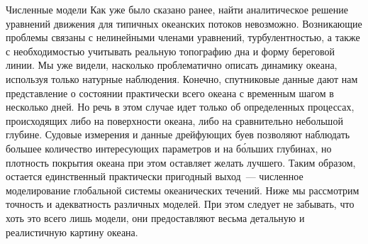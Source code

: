 
\begin{chapter}{Численные модели}\label{chap:15}
Как уже было сказано ранее, найти аналитическое решение уравнений
движения для типичных океанских потоков невозможно. Возникающие проблемы
связаны с нелинейными членами уравнений, 
турбулентностью, а также с
необходимостью учитывать реальную топографию дна и форму береговой
линии. Мы уже видели, насколько проблематично описать динамику океана,
используя только натурные наблюдения. Конечно, спутниковые данные дают
нам представление о состоянии практически всего океана с временным
шагом в несколько дней. Но речь в этом случае идет только об
определенных процессах, происходящих либо на поверхности океана, либо на
сравнительно небольшой глубине.
Судовые измерения и данные дрейфующих буев позволяют наблюдать большее 
количество интересующих параметров и на б\'{о}льших глубинах, но плотность
покрытия океана при этом оставляет желать лучшего.
Таким образом, остается единственный практически пригодный
выход~--- численное моделирование глобальной системы
океанических течений. Ниже мы рассмотрим
точность и адекватность различных моделей.
При этом следует не забывать, что хоть это всего лишь модели, они 
предоставляют весьма детальную и реалистичную картину океана.
%


\end{chapter}
